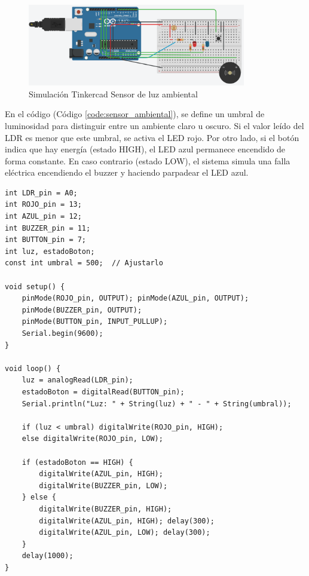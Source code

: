\begin{figure}[H]
    \centering
    \includegraphics[width=0.85\textwidth]{./img/ckpt_1.png}
    \caption{Simulación Tinkercad Sensor de luz ambiental}
    \label{fig:luz_ambiental}
\end{figure}

En el código (Código \ref{code:sensor_ambiental}), se define un umbral de luminosidad para distinguir entre un ambiente claro u oscuro. Si el valor leído del LDR es menor que este umbral, se activa el LED rojo. Por otro lado, si el botón indica que hay energía (estado HIGH), el LED azul permanece encendido de forma constante. En caso contrario (estado LOW), el sistema simula una falla eléctrica encendiendo el buzzer y haciendo parpadear el LED azul.

\begin{lstlisting}[style=cppstyle, caption={Código en C++ para el sensor ambiental.}, label={code:sensor_ambiental}]
int LDR_pin = A0;
int ROJO_pin = 13;
int AZUL_pin = 12;
int BUZZER_pin = 11;
int BUTTON_pin = 7;
int luz, estadoBoton;
const int umbral = 500;  // Ajustarlo

void setup() {
    pinMode(ROJO_pin, OUTPUT); pinMode(AZUL_pin, OUTPUT);
    pinMode(BUZZER_pin, OUTPUT);
    pinMode(BUTTON_pin, INPUT_PULLUP);
    Serial.begin(9600);
}

void loop() {
    luz = analogRead(LDR_pin);
    estadoBoton = digitalRead(BUTTON_pin);
    Serial.println("Luz: " + String(luz) + " - " + String(umbral));
    
    if (luz < umbral) digitalWrite(ROJO_pin, HIGH);
    else digitalWrite(ROJO_pin, LOW);
    
    if (estadoBoton == HIGH) {
        digitalWrite(AZUL_pin, HIGH);
        digitalWrite(BUZZER_pin, LOW);
    } else {
        digitalWrite(BUZZER_pin, HIGH);
        digitalWrite(AZUL_pin, HIGH); delay(300);
        digitalWrite(AZUL_pin, LOW); delay(300);
    }
    delay(1000);
}    
\end{lstlisting}


